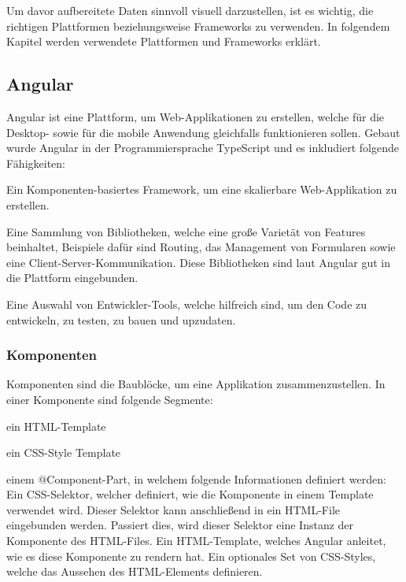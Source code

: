 Um davor aufbereitete Daten sinnvoll visuell darzustellen, ist es wichtig, die richtigen Plattformen beziehungsweise Frameworks zu verwenden. In folgendem Kapitel werden verwendete Plattformen und Frameworks erklärt. 
\subsection{Angular}
 
Angular ist eine Plattform, um Web-Applikationen zu erstellen, welche für die Desktop- sowie für die mobile Anwendung gleichfalls funktionieren sollen. Gebaut wurde Angular in der Programmiersprache TypeScript und es inkludiert folgende Fähigkeiten:
 
\begin{compactitem}
    \item Ein Komponenten-basiertes Framework, um eine skalierbare Web-Applikation zu erstellen.
    \item Eine Sammlung von Bibliotheken, welche eine große Varietät von Features beinhaltet, Beispiele dafür sind Routing, das Management von Formularen sowie eine Client-Server-Kommunikation. Diese Bibliotheken sind laut Angular gut in die Plattform eingebunden.
    \item Eine Auswahl von Entwickler-Tools, welche hilfreich sind, um den Code zu entwickeln, zu testen, zu bauen und upzudaten.
\end{compactitem}
 
\subsubsection{Komponenten}
Komponenten sind die Baublöcke, um eine Applikation zusammenzustellen. In einer Komponente sind folgende Segmente:
 
\begin{compactitem}
    \item ein HTML-Template
    \item ein CSS-Style Template
    \item einem @Component-Part, in welchem folgende Informationen definiert werden:
    \subitem Ein CSS-Selektor, welcher definiert, wie die Komponente in einem Template verwendet wird. Dieser Selektor kann anschließend in ein HTML-File eingebunden werden. Passiert dies, wird dieser Selektor eine Instanz der Komponente des HTML-Files.
    \subitem Ein HTML-Template, welches Angular anleitet, wie es diese Komponente zu rendern hat.
    \subitem Ein optionales Set von CSS-Styles, welche das Aussehen des HTML-Elements definieren.
\end{compactitem}
\cite{angularOfficialSite}
 
